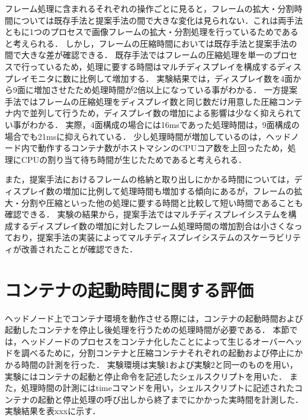  フレーム処理に含まれるそれぞれの操作ごとに見ると，フレームの拡大・分割時間については既存手法と提案手法の間で大きな変化は見られない．これは両手法ともに1つのプロセスで画像フレームの拡大・分割処理を行っているためであると考えられる．
 しかし，フレームの圧縮時間においては既存手法と提案手法の間で大きな差が確認できる．
 既存手法ではフレームの圧縮処理を単一のプロセスで行っているため，処理に要する時間はマルチディスプレイを構成するディスプレイモニタに数に比例して増加する．
 実験結果では，ディスプレイ数を4面から9面に増加させたため処理時間が2倍以上になっている事がわかる．
 一方提案手法ではフレームの圧縮処理をディスプレイ数と同じ数だけ用意した圧縮コンテナ内で並列して行うため，ディスプレイ数の増加による影響は少なく抑えられてい事がわかる．
 実際，4面構成の場合には16msであった処理時間は，9面構成の場合でも21msに抑えられている．
 少し処理時間が増加しているのは，ヘッドノード内で動作するコンテナ数がホストマシンのCPUコア数を上回ったため，処理にCPUの割り当て待ち時間が生じたためであると考えられる．

 また，提案手法におけるフレームの格納と取り出しにかかる時間については，ディスプレイ数の増加に比例して処理時間も増加する傾向にあるが，フレームの拡大・分割や圧縮といった他の処理に要する時間と比較して短い時間であることも確認できる．
 実験の結果から，提案手法ではマルチディスプレイシステムを構成するディスプレイ数の増加に対したフレーム処理時間の増加割合は小さくなっており，提案手法の実装によってマルチディスプレイシステムのスケーラビリティが改善されたことが確認できた．


\section{コンテナの起動時間に関する評価}
ヘッドノード上でコンテナ環境を動作させる際には，コンテナの起動時間および起動したコンテナを停止し後処理を行うための処理時間が必要である．
本節では，ヘッドノードのプロセスをコンテナ化したことによって生じるオーバーヘッドを調べるために，分割コンテナと圧縮コンテナそれぞれの起動および停止にかかる時間の計測を行った．
実験環境は実験1および実験2と同一のものを用い，実験にはコンテナの起動と停止命令を記述したシェルスクリプトを用いた．
また，処理時間の計測にはtimeコマンドを用い，シェルスクリプトに記述されたコンテナの起動と停止処理の呼び出しから終了までにかかった実時間を計測した．
実験結果を表xxxに示す．

\begin{table}[H]
    \centering
    \caption{コンテナの起動と停止に要する時間}\label{tab1}
\end{table}

